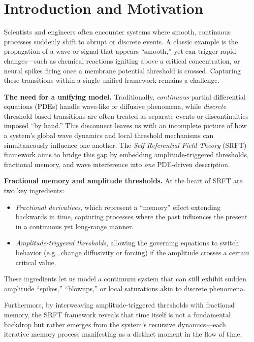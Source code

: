 \documentclass[12pt]{article}
\begin{document}
\tableofcontents

\section{Introduction and Motivation}
\label{sec:intro_monograph}

Scientists and engineers often encounter systems where smooth, continuous processes 
suddenly shift to abrupt or discrete events. A classic example is the propagation 
of a wave or signal that appears “smooth,” yet can trigger rapid changes—such as 
chemical reactions igniting above a critical concentration, or neural spikes firing 
once a membrane potential threshold is crossed. Capturing these transitions within 
a single unified framework remains a challenge. 

\medskip

\noindent
\textbf{The need for a unifying model.}  
Traditionally, \emph{continuous} partial differential equations (PDEs) handle 
wave-like or diffusive phenomena, while \emph{discrete} threshold-based 
transitions are often treated as separate events or discontinuities imposed 
“by hand.” This disconnect leaves us with an incomplete picture of how a 
system’s global wave dynamics and local threshold mechanisms can simultaneously 
influence one another. The \emph{Self Referential Field Theory } (SRFT) framework 
aims to bridge this gap by embedding amplitude-triggered thresholds, fractional 
memory, and wave interference into \emph{one} PDE-driven description. 

\medskip

\noindent
\textbf{Fractional memory and amplitude thresholds.}  
At the heart of SRFT are two key ingredients:
\begin{itemize}
    \item \emph{Fractional derivatives}, which represent a “memory” effect 
          extending backwards in time, capturing processes where the past 
          influences the present in a continuous yet long-range manner.
    \item \emph{Amplitude-triggered thresholds}, allowing the governing 
          equations to switch behavior (e.g., change diffusivity or forcing) 
          if the amplitude crosses a certain critical value.
\end{itemize}
These ingredients let us model a continuum system that can still exhibit sudden 
amplitude “spikes,” “blowups,” or local saturations akin to discrete phenomena.

Furthermore, by interweaving amplitude-triggered thresholds with fractional memory, the SRFT framework reveals that time itself is not a fundamental backdrop but rather emerges from the system’s recursive dynamics—each iterative memory process manifesting as a distinct moment in the flow of time.  
\end{document}
